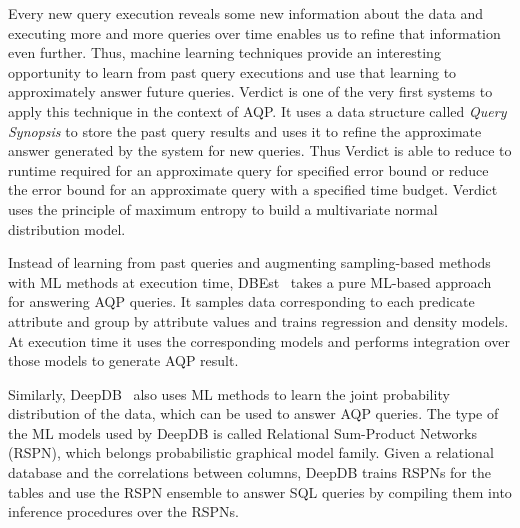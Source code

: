 Every new query execution reveals some new information about the data and executing more and more queries over time enables us to refine that information even further.
Thus, machine learning techniques provide an interesting opportunity to learn from past query executions and use that learning to approximately answer future queries.
Verdict \cite{verdict} is one of the very first systems to apply this technique in the context of AQP.
It uses a data structure called \textit{Query Synopsis} to store the past query results and uses it to refine the approximate answer generated by the system for new queries.
Thus Verdict is able to reduce to runtime required for an approximate query for specified error bound or reduce the error bound for an approximate query with a specified time budget.
Verdict uses the principle of maximum entropy to build a multivariate normal distribution model.

Instead of learning from past queries and augmenting sampling-based methods with ML methods at execution time, DBEst~\cite{dbest} takes a pure ML-based approach for answering AQP queries.
It samples data corresponding to each predicate attribute and group by attribute values and trains regression and density models.
At execution time it uses the corresponding models and performs integration over those models to generate AQP result.

Similarly, DeepDB~\cite{deepdb} also uses ML methods to learn the joint probability distribution of the data, which can be used to answer AQP queries.
The type of the ML models used by DeepDB is called Relational Sum-Product Networks (RSPN), which belongs probabilistic graphical model family.
Given a relational database and the correlations between columns, DeepDB trains RSPNs for the tables and use the RSPN ensemble to answer SQL queries by compiling them into inference procedures over the RSPNs.













